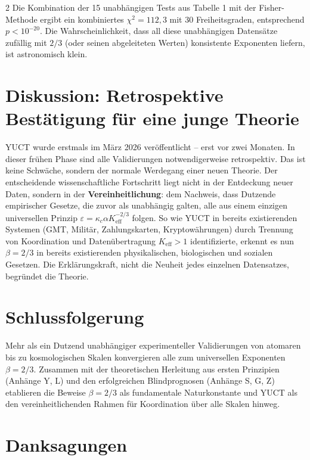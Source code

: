 \documentclass[11pt,a4paper]{article}
\newcommand{\betaf}{\beta}
\begin{document}
\begin{multicols}{2}
		Die Kombination der 15 unabhängigen Tests aus Tabelle 1 mit der Fisher-Methode ergibt ein kombiniertes \(\chi^2 = 112,3\) mit 30 Freiheitsgraden, entsprechend \(p < 10^{-20}\). Die Wahrscheinlichkeit, dass all diese unabhängigen Datensätze zufällig mit \(2/3\) (oder seinen abgeleiteten Werten) konsistente Exponenten liefern, ist astronomisch klein.
		
		\section{Diskussion: Retrospektive Bestätigung für eine junge Theorie}
		
		YUCT wurde erstmals im März 2026 veröffentlicht – erst vor zwei Monaten. In dieser frühen Phase sind alle Validierungen notwendigerweise retrospektiv. Das ist keine Schwäche, sondern der normale Werdegang einer neuen Theorie. Der entscheidende wissenschaftliche Fortschritt liegt nicht in der Entdeckung neuer Daten, sondern in der \textbf{Vereinheitlichung}: dem Nachweis, dass Dutzende empirischer Gesetze, die zuvor als unabhängig galten, alle aus einem einzigen universellen Prinzip \(\varepsilon = \kappa_c \alpha K_{\mathrm{eff}}^{-2/3}\) folgen. So wie YUCT in bereits existierenden Systemen (GMT, Militär, Zahlungskarten, Kryptowährungen) durch Trennung von Koordination und Datenübertragung \(K_{\mathrm{eff}} > 1\) identifizierte, erkennt es nun \(\beta = 2/3\) in bereits existierenden physikalischen, biologischen und sozialen Gesetzen. Die Erklärungskraft, nicht die Neuheit jedes einzelnen Datensatzes, begründet die Theorie.
		
		\section{Schlussfolgerung}
		
		Mehr als ein Dutzend unabhängiger experimenteller Validierungen von atomaren bis zu kosmologischen Skalen konvergieren alle zum universellen Exponenten \(\betaf = 2/3\). Zusammen mit der theoretischen Herleitung aus ersten Prinzipien (Anhänge Y, L) und den erfolgreichen Blindprognosen (Anhänge S, G, Z) etablieren die Beweise \(\betaf = 2/3\) als fundamentale Naturkonstante und YUCT als den vereinheitlichenden Rahmen für Koordination über alle Skalen hinweg.
		
		\section*{Danksagungen}
		

\end{multicols}
\end{document}
